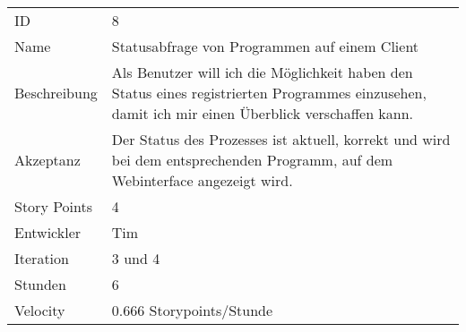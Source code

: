 \begin{table}[htbp]
\begin{minipage}{\linewidth}
\setlength{\tymax}{0.5\linewidth}
\centering
\small
\begin{tabulary}{\textwidth}{|l|p{10cm}|} \toprule
 ID   &8\\


Name  &Statusabfrage von Programmen auf einem Client\\
Beschreibung&Als Benutzer will ich die Möglichkeit haben den Status eines registrierten Programmes einzusehen, damit ich mir einen Überblick verschaffen kann.\\
Akzeptanz &Der Status des Prozesses ist aktuell, korrekt und wird bei dem entsprechenden Programm, auf dem Webinterface angezeigt wird.\\
Story Points&4\\
Entwickler &Tim\\
Iteration &3 und 4\\
Stunden  &6\\
Velocity &0.666 Storypoints\slash Stunde\\
\bottomrule

\end{tabulary}
\end{minipage}
\end{table}



